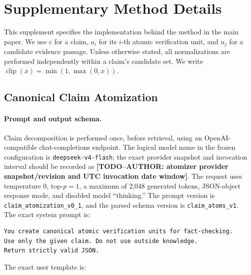 \providecommand{\placeholder}[1]{\textbf{[TODO--AUTHOR: #1]}}

\section{Supplementary Method Details}
\label{supp:method-details}

This supplement specifies the implementation behind the method in the main
paper.  We use \(c\) for a claim, \(a_i\) for its \(i\)-th atomic
verification unit, and \(u_j\) for a candidate evidence passage.  Unless
otherwise stated, all normalizations are performed independently within a
claim's candidate set.  We write
\(\operatorname{clip}(x)=\min(1,\max(0,x))\).

\subsection{Canonical Claim Atomization}
\label{supp:atomization}

\paragraph{Prompt and output schema.}
Claim decomposition is performed once, before retrieval, using an
OpenAI-compatible chat-completions endpoint.  The logical model name in the
frozen configuration is \texttt{deepseek-v4-flash}; the exact provider
snapshot and invocation interval should be recorded as
\placeholder{atomizer provider snapshot/revision and UTC invocation date
window}.  The request uses temperature \(0\), top-\(p=1\), a maximum of 2,048
generated tokens, JSON-object response mode, and disabled model ``thinking.''
The prompt version is \texttt{claim\_atomization\_v0\_1}, and the parsed schema
version is \texttt{claim\_atoms\_v1}.  The exact system prompt is:

\begin{lstlisting}
You create canonical atomic verification units for fact-checking.
Use only the given claim. Do not use outside knowledge.
Return strictly valid JSON.
\end{lstlisting}

The exact user template is:

